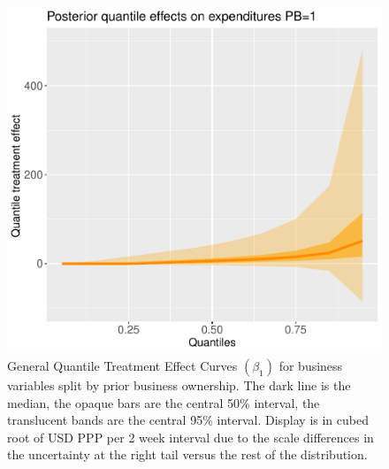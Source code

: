 \documentclass[english,12pt]{article}\usepackage{lmodern}
\numberwithin{equation}{section}
\begin{document}
\begin{figure}[h!]
    \includegraphics[scale=0.45]{posterior_parent_quantile_TEs_expenditures_pb_1_lognormal.pdf}
  \caption{ General Quantile Treatment Effect Curves $(\beta_1)$ for business variables split by prior business ownership. The dark line is the median, the opaque bars are the central 50\% interval, the translucent bands are the central 95\% interval. Display is in cubed root of USD PPP per 2 week interval due to the scale differences in the uncertainty at the right tail versus the rest of the distribution. }\label{posterior mean quantiles profit pb split}
\end{figure}
\end{document}
